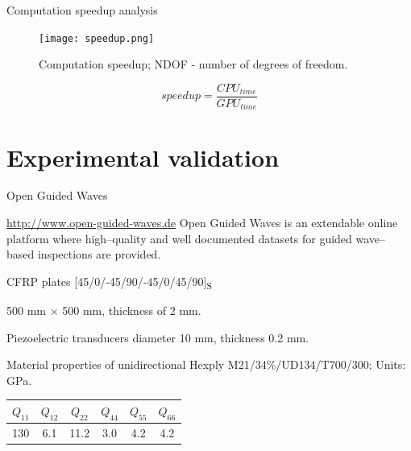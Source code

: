 \documentclass[10pt]{beamer} %
\begin{document}
\begin{frame}{Computation speedup analysis}
	\begin{figure} [h!]
		\centering
		\texttt{[image: speedup.png]}	
		\caption{Computation speedup; NDOF - number of degrees of freedom.}
		\label{fig:speedup}
	\end{figure}
	\begin{equation*}
	speedup = \frac{CPU_{time}}{GPU_{time}}
	\label{eq:speedup}
	\end{equation*}
\end{frame}
\section{Experimental validation}
\begin{frame}{Open Guided Waves}
	\begin{block}{\url{http://www.open-guided-waves.de}}
		Open Guided Waves is an extendable online platform where high--quality and well documented datasets for guided wave--based inspections are provided.
	\end{block}

	CFRP plates [45/0/-45/90/-45/0/45/90]\textsubscript{S}
	
	500 mm $\times$ 500 mm, thickness of 2 mm. 
	
	Piezoelectric transducers diameter 10 mm, thickness 0.2 mm.
	
	\begin{table}
		\renewcommand{\arraystretch}{1.3}
		\centering \small
		Material properties of unidirectional Hexply M21/34\%/UD134/T700/300; Units: GPa.
		
		\begin{tabular}{cccccc} 
			\toprule
			$Q_{11}$ & $Q_{12}$  & $Q_{22}$ & $Q_{44}$ & $Q_{55}$ & $Q_{66}$\\
			\midrule
			130& 6.1& 11.2 & 3.0 & 4.2 & 4.2\\
			\bottomrule 
		\end{tabular} 
		\label{tab:mat_prop}
	\end{table}
\end{frame}
\end{document}
